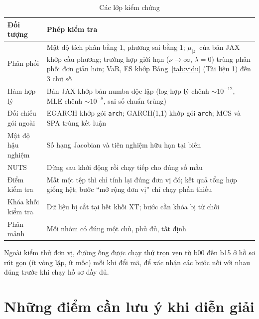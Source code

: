 \documentclass[12pt,a4paper]{article}
\theoremstyle{remark}
\newcommand{\ma}[1]{\texttt{\small #1}}
\newcommand{\XT}{\mathrm{XT}}
\begin{document}
\begin{table}[h]
\centering
\caption{Các lớp kiểm chứng}\label{tab:kiemthu}
\begin{tabular}{@{}p{4.6cm}p{9.8cm}@{}}
\toprule
\textbf{Đối tượng} & \textbf{Phép kiểm tra} \\
\midrule
Phân phối & Mật độ tích phân bằng $1$, phương sai bằng $1$; $\mu_{|z|}$ của bản JAX khớp cầu phương; trường hợp giới hạn ($\nu\to\infty$, $\lambda=0$) trùng phân phối đơn giản hơn; VaR, ES khớp Bảng~\ref{tab:vidu} (Tài liệu 1) đến $3$ chữ số \\
Hàm hợp lý & Bản JAX khớp bản numba độc lập (log-hợp lý chênh $\sim10^{-12}$, MLE chênh $\sim10^{-8}$, sai số chuẩn trùng) \\
Đối chiếu gói ngoài & EGARCH khớp gói \ma{arch}; GARCH(1,1) khớp gói \ma{arch}; MCS và SPA trùng kết luận \\
Mật độ hậu nghiệm & Số hạng Jacobian và tiên nghiệm hữu hạn tại biên \\
NUTS & Dừng sau khởi động rồi chạy tiếp cho đúng số mẫu \\
Điểm kiểm tra & Mất một tệp thì chỉ tính lại đúng đơn vị đó; kết quả tổng hợp giống hệt; bước ``mở rộng đơn vị'' chỉ chạy phần thiếu \\
Khóa khối kiểm tra & Dữ liệu bị cắt tại hết khối $\XT$; bước cần khóa bị từ chối \\
Phân mảnh & Mỗi nhóm có đúng một chủ, phủ đủ, tất định \\
\bottomrule
\end{tabular}
\end{table}

Ngoài kiểm thử đơn vị, đường ống được chạy thử trọn vẹn từ b00 đến b15 ở hồ sơ rút gọn (ít vòng lặp, ít mốc) mỗi khi đổi mã, để xác nhận các bước nối với nhau đúng trước khi chạy hồ sơ đầy đủ.

\section{Những điểm cần lưu ý khi diễn giải}\label{sec:luuy}
\end{document}
